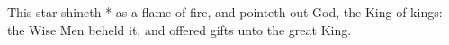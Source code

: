 This star shineth * as a flame of fire, and pointeth out God, the King of kings: the Wise Men beheld it, and offered gifts unto the great King.